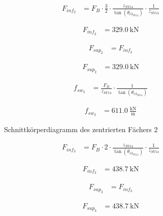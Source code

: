 \documentclass[
  11pt,
  letterpaper,
]{scrreprt}
\begin{document}
$$
\begin{aligned}
F_{inf_{2}} &= F_{B} \cdot \frac{ 3 }{ 2 } \cdot \frac{ z_{SV14} }{ \tan \left( \theta_{c3_{SV14}} \right) } \cdot \frac{1} { z_{SV14} } \; 
\end{aligned}
$$

$$
\begin{aligned}
F_{inf_{2}} &= 329.0\ \mathrm{kN} \;
\end{aligned}
$$

$$
\begin{aligned}
F_{sup_{2}} &= F_{inf_{2}} \; 
\end{aligned}
$$

$$
\begin{aligned}
F_{sup_{2}} &= 329.0\ \mathrm{kN} \; 
\end{aligned}
$$

$$
\begin{aligned}
f_{sw_{2}} &= \frac{ F_{B} }{ z_{SV14} } \cdot \frac{1} { \tan \left( \theta_{c3_{SV14}} \right) } \; 
\end{aligned}
$$

$$
\begin{aligned}
f_{sw_{2}} &= 611.0\ \frac{\mathrm{kN}}{\mathrm{m}} \;
\end{aligned}
$$

\begin{figure}[H]


\caption{\label{fig-skd_3_spannungsfelder_sv14}Schnittkörperdiagramm des
zentrierten Fächers 2}

\end{figure}%

$$
\begin{aligned}
F_{inf_{3}} &= F_{B} \cdot 2 \cdot \frac{ z_{SV14} }{ \tan \left( \theta_{c3_{SV14}} \right) } \cdot \frac{1} { z_{SV14} } \; 
\end{aligned}
$$

$$
\begin{aligned}
F_{inf_{3}} &= 438.7\ \mathrm{kN} \;
\end{aligned}
$$

$$
\begin{aligned}
F_{sup_{3}} &= F_{inf_{3}} \; 
\end{aligned}
$$

$$
\begin{aligned}
F_{sup_{3}} &= 438.7\ \mathrm{kN} \;
\end{aligned}
$$
\end{document}
